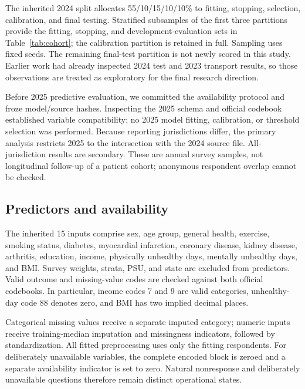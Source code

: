 \documentclass[conference,letterpaper]{IEEEtran}
\begin{document}
The inherited 2024 split allocates 55/10/15/10/10\% to fitting, stopping, selection, calibration, and final testing. Stratified subsamples of the first three partitions provide the fitting, stopping, and development-evaluation sets in Table~\ref{tab:cohort}; the calibration partition is retained in full. Sampling uses fixed seeds. The remaining final-test partition is not newly scored in this study. Earlier work had already inspected 2024 test and 2023 transport results, so those observations are treated as exploratory for the final research direction.

Before 2025 predictive evaluation, we committed the availability protocol and froze model/source hashes. Inspecting the 2025 schema and official codebook established variable compatibility; no 2025 model fitting, calibration, or threshold selection was performed. Because reporting jurisdictions differ, the primary analysis restricts 2025 to the intersection with the 2024 source file. All-jurisdiction results are secondary. These are annual survey samples, not longitudinal follow-up of a patient cohort; anonymous respondent overlap cannot be checked.

\subsection{Predictors and availability}
The inherited 15 inputs comprise sex, age group, general health, exercise, smoking status, diabetes, myocardial infarction, coronary disease, kidney disease, arthritis, education, income, physically unhealthy days, mentally unhealthy days, and BMI. Survey weights, strata, PSU, and state are excluded from predictors. Valid outcome and missing-value codes are checked against both official codebooks. In particular, income codes 7 and 9 are valid categories, unhealthy-day code 88 denotes zero, and BMI has two implied decimal places.

Categorical missing values receive a separate imputed category; numeric inputs receive training-median imputation and missingness indicators, followed by standardization. All fitted preprocessing uses only the fitting respondents. For deliberately unavailable variables, the complete encoded block is zeroed and a separate availability indicator is set to zero. Natural nonresponse and deliberately unavailable questions therefore remain distinct operational states.
\end{document}
